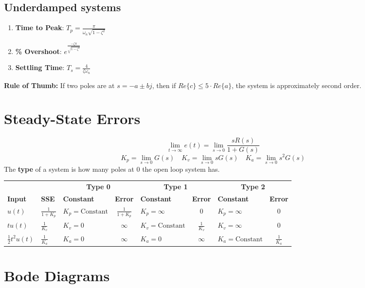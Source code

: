 \subsection*{Underdamped systems}
\begin{enumerate}
  \item[] \textbf{Time to Peak}: $T_p = \frac{\pi}{\omega_n\sqrt{1-\zeta^2}}$
  \item[] \textbf{\% Overshoot}: $e^{\frac{-\zeta\pi}{\sqrt{1-\zeta^2}}}$
  \item[] \textbf{Settling Time}: $T_s = \frac{4}{\zeta\omega_n}$
\end{enumerate}
\textbf{Rule of Thumb:} If two poles are at $s = -a\pm bj$, then if $Re\{c\} \leq 5\cdot Re\{a\}$, the system is approximately second order.
\section*{Steady-State Errors}
\[
  \lim_{t\to\infty}e(t) = \lim_{s\to 0}\frac{sR(s)}{1 + G(s)}
\]
\[
  K_p = \lim_{s\to0}G(s) \quad K_v=\lim_{s\to 0}sG(s) \quad K_a = \lim_{s\to0}s^2G(s)
\]
The \textbf{type} of a system is how many poles at 0 the open loop system has.
\begin{center}
    \begin{tabularx}{\textwidth}{XXXcXcXc}
        \toprule
		& & \multicolumn{2}{c}{\textbf{Type 0}} & \multicolumn{2}{c}{\textbf{Type 1}} & \multicolumn{2}{c}{\textbf{Type 2}}\\
		\cmidrule(lr){3-4}
		\cmidrule(lr){5-6}
		\cmidrule(lr){7-8}
		\textbf{Input} & \textbf{SSE} & \textbf{Constant} & \textbf{Error} & \textbf{Constant} & \textbf{Error} & \textbf{Constant} & \textbf{Error}\\
		\midrule
		$u(t)$ & $\frac{1}{1+K_p}$ & $K_p=\text{Constant}$ & $\frac{1}{1+K_p}$ & $K_p = \infty$ & 0 & $K_p = \infty$ & $0$\\
		$tu(t)$ & $\frac{1}{K_v}$ & $K_v = 0$ & $\infty$ & $K_v = \text{Constant}$ & $\frac{1}{K_v}$ & $K_v = \infty$ & $0$\\
		$\frac{1}{2}t^2u(t)$ & $\frac{1}{K_a}$ & $K_a = 0$ & $\infty$ & $K_a = 0$ & $\infty$ & $K_a = \text{Constant}$ & $\frac{1}{K_a}$
    \end{tabularx}
\end{center}
\clearpage
\section*{Bode Diagrams}
